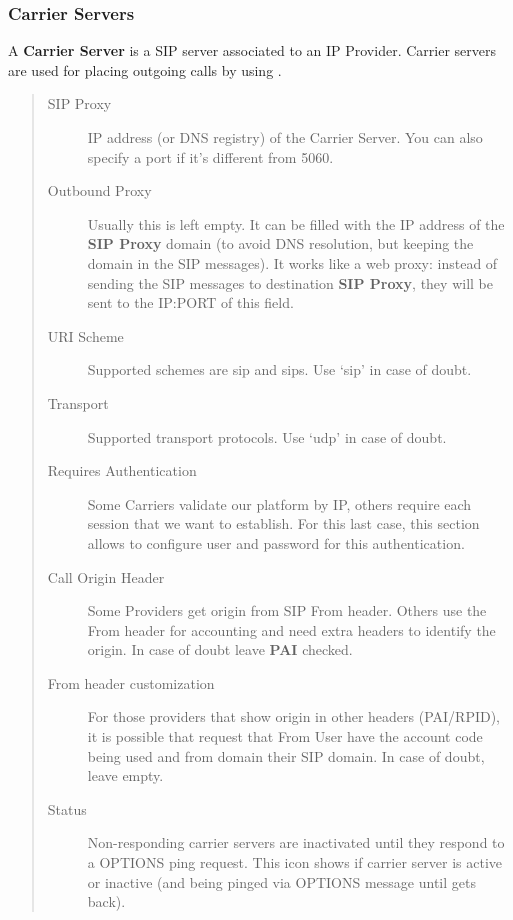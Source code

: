 \documentclass[letterpaper,10pt,spanish]{sphinxmanual}
\begin{document}
\subsubsection{Carrier Servers}
\label{administration_portal/brand/providers/carriers:carrier-servers}
A \textbf{Carrier Server} is a SIP server associated to an IP Provider. Carrier servers
are used for placing outgoing calls by using {\hyperref[administration_portal/brand/routing/outgoing_routings:outgoing\string-routings]{}}.
\begin{quote}
\begin{description}
\item[{SIP Proxy}] \leavevmode
IP address (or DNS registry) of the Carrier Server. You can also specify
a port if it's different from 5060.

\item[{Outbound Proxy}] \leavevmode
Usually this is left empty. It can be filled with the IP address of the
\textbf{SIP Proxy} domain (to avoid DNS resolution, but keeping the domain
in the SIP messages). It works like a web proxy: instead of sending the
SIP messages to destination \textbf{SIP Proxy}, they will be sent to the
IP:PORT of this field.

\item[{URI Scheme}] \leavevmode
Supported schemes are sip and sips. Use `sip' in case of doubt.

\item[{Transport}] \leavevmode
Supported transport protocols. Use `udp' in case of doubt.

\item[{Requires Authentication}] \leavevmode
Some Carriers validate our platform by IP, others require
each session that we want to establish. For this last case, this section
allows to configure user and password for this authentication.

\item[{Call Origin Header}] \leavevmode
Some Providers get origin from SIP From header. Others use the From
header for accounting and need extra headers to identify the origin.
In case of doubt leave \textbf{PAI} checked.

\item[{From header customization}] \leavevmode
For those providers that show origin in other headers (PAI/RPID), it is
possible that request that From User have the account code being used
and from domain their SIP domain. In case of doubt, leave empty.

\item[{Status}] \leavevmode
Non-responding carrier servers are inactivated until they respond to a OPTIONS ping request. This icon shows
if carrier server is active or inactive (and being pinged via OPTIONS message until gets back).

\end{description}
\end{quote}
\end{document}
